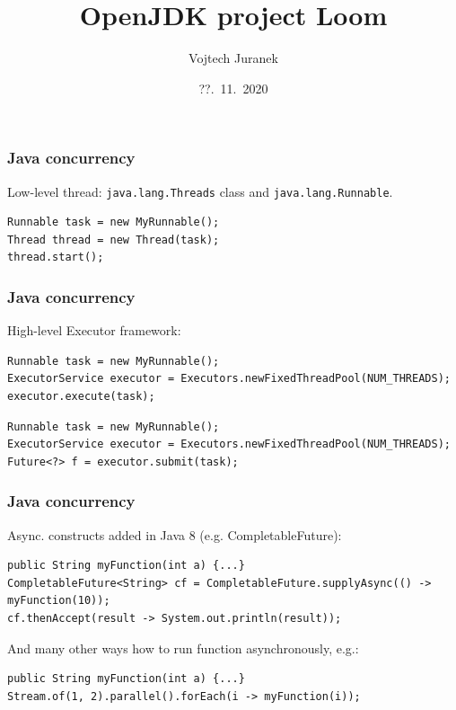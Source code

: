 \documentclass[10pt,utf8]{beamer}
\title{OpenJDK project Loom}
\author{Vojtech Juranek}
\institute[Red Hat]{oVirt storage team}
\date{??.~11.~2020}
\begin{document}
\begin{frame}
	\titlepage
\end{frame}

\begin{frame}[fragile]
    \frametitle{Java concurrency}
    Low-level thread: \texttt{java.lang.Threads} class and \texttt{java.lang.Runnable}.
    \begin{lstlisting}[style=java]
Runnable task = new MyRunnable();
Thread thread = new Thread(task);
thread.start();
    \end{lstlisting}
\end{frame}

\begin{frame}[fragile]
    \frametitle{Java concurrency}
    High-level Executor framework:
    \begin{lstlisting}[style=java]
Runnable task = new MyRunnable();
ExecutorService executor = Executors.newFixedThreadPool(NUM_THREADS);
executor.execute(task);
    \end{lstlisting}
    
    \vspace{0.5cm}
    \begin{lstlisting}[style=java]
Runnable task = new MyRunnable();
ExecutorService executor = Executors.newFixedThreadPool(NUM_THREADS);
Future<?> f = executor.submit(task);
    \end{lstlisting}
\end{frame}

\begin{frame}[fragile]
    \frametitle{Java concurrency}
    Async. constructs added in Java 8 (e.g. CompletableFuture):
    \begin{lstlisting}[style=java]
public String myFunction(int a) {...}
CompletableFuture<String> cf = CompletableFuture.supplyAsync(() -> myFunction(10));
cf.thenAccept(result -> System.out.println(result));
    \end{lstlisting}
And many other ways how to run function asynchronously, e.g.:
    \begin{lstlisting}[style=java]
public String myFunction(int a) {...}
Stream.of(1, 2).parallel().forEach(i -> myFunction(i));
    \end{lstlisting}
\end{frame}
\end{document}
